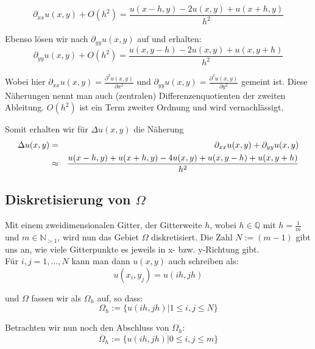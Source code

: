 \begin{equation}
\partial_{xx} u(x,y) + O(h^{2}) = \frac {u(x-h,y) - 2u(x,y) + u(x+h,y)} {h^{2}}
\end{equation}

Ebenso lösen wir nach $\partial_{yy} u(x,y)$ auf und erhalten:
\begin{equation}
\partial_{yy} u(x,y) + O(h^{2}) = \frac {u(x,y-h) - 2u(x,y) + u(x,y+h)} {h^{2}}
\end{equation}

Wobei hier $\partial_{xx} u(x,y) = \frac {\partial^{2} u(x,y)} {\partial x^{2}}$ und $\partial_{yy} u(x,y) = \frac {\partial^{2} u(x,y)} {\partial y^{2}}$ gemeint ist.
Diese Näherungen nennt man auch (zentralen) Differenzenquotienten der zweiten Ableitung. $O(h^{2})$ ist ein Term zweiter Ordnung und wird vernachlässigt.

Somit erhalten wir für $\Delta u(x,y)$ die Näherung
\begin{eqnarray}
\Delta u(x,y) &=& \partial_{xx} u(x,y) + \partial_{yy} u(x,y) \notag \\
&\approx& \frac {u(x-h,y) + u(x+h,y) - 4u(x,y) + u(x,y-h) + u(x,y+h)} {h^{2}}
\end{eqnarray}

\subsection{Diskretisierung von $\Omega$}\label{ss.Diskretisierung}

Mit einem zweidimensionalen Gitter, der Gitterweite $h$, wobei $h \in \mathbb{Q}$ mit $h = \frac {1} {m}$ und $m \in \mathbb{N}_{>1}$, wird nun das Gebiet $\Omega$ diskretisiert. Die Zahl $N := (m-1)$ gibt uns an, wie viele Gitterpunkte es jeweils in x- bzw. y-Richtung gibt.\\

Für $i,j = 1,...,N$ kann man dann $u(x,y)$ auch schreiben als:
\begin{equation}
u(x_{i},y_{j}) = u(ih,jh)
\end{equation}

und $\Omega$ fassen wir als $\Omega_{h}$ auf, so dass:
\begin{equation}
\Omega_{h} := \{u(ih, jh) | 1 \le i,j \le N\}
\end{equation}

Betrachten wir nun noch den Abschluss von $\Omega_{h}$:
\begin{equation}
\overline \Omega_{h} := \{u(ih, jh) | 0 \le i,j \le m\}
\end{equation}

